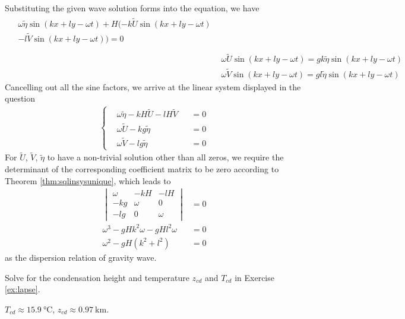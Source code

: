\begin{Answer}
Substituting the given wave solution forms into the equation, we have
\begin{align*}
\begin{split}
&\omega\tilde{\eta}\sin(kx+ly-\omega t) + H(-k\tilde{U}\sin(kx+ly-\omega t) \\
&-l\tilde{V}\sin(kx+ly-\omega t)) = 0 \\    
\end{split} \\
&\omega\tilde{U}\sin(kx+ly-\omega t) = gk\tilde{\eta}\sin(kx+ly-\omega t) \\
&\omega\tilde{V}\sin(kx+ly-\omega t) = gl\tilde{\eta}\sin(kx+ly-\omega t)
\end{align*}
Cancelling out all the sine factors, we arrive at the linear system displayed in the question
\begin{align*}
\left\{\begin{alignedat}{2}
&\omega \tilde{\eta} - kH \tilde{U} - lH \tilde{V} & &= 0 \\
&\omega \tilde{U} - kg \tilde{\eta} & &= 0 \\
&\omega \tilde{V} - lg \tilde{\eta} & &= 0
\end{alignedat}\right.
\end{align*}
For $\tilde{U}$, $\tilde{V}$, $\tilde{\eta}$ to have a non-trivial solution other than all zeros, we require the determinant of the corresponding coefficient matrix to be zero according to Theorem \ref{thm:sqlinsysunique}, which leads to
\begin{align*}
\begin{vmatrix}
\omega & -kH & -lH \\
-kg & \omega & 0 \\
-lg & 0 & \omega
\end{vmatrix} &= 0 \\
\omega^3 - gHk^2\omega - gHl^2\omega &= 0 \\
\omega^2 - gH(k^2 + l^2) &= 0 
\end{align*}
as the dispersion relation of gravity wave.
\end{Answer}

\begin{Exercise}
Solve for the condensation height and temperature $z_{cd}$ and $T_{cd}$ in Exercise \ref{ex:lapse}.
\end{Exercise}
\begin{Answer}
$T_{cd} \approx \SI{15.9}{\celsius}$, $z_{cd} \approx \SI{0.97}{\km}$.
\end{Answer}

